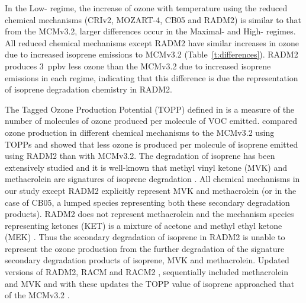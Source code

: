 In the Low- regime, the increase of ozone with temperature using the reduced chemical mechanisms (CRIv2, MOZART-4, CB05 and RADM2) is similar to that from the MCMv3.2, larger differences occur in the Maximal- and High- regimes.
All reduced chemical mechanisms except RADM2 have similar increases in ozone due to increased isoprene emissions to MCMv3.2 (Table~\ref{t:differences}).
RADM2 produces $3$~ppbv less ozone than the MCMv3.2 due to increased isoprene emissions in each  regime, indicating that this difference is due the representation of isoprene degradation chemistry in RADM2.

The Tagged Ozone Production Potential (TOPP) defined in \citet{Butler:2011} is a measure of the number of molecules of ozone produced per molecule of VOC emitted.
\citet{Coates:2015} compared ozone production in different chemical mechanisms to the MCMv3.2 using TOPPs and showed that less ozone is produced per molecule of isoprene emitted using RADM2 than with MCMv3.2.
The degradation of isoprene has been extensively studied and it is well-known that methyl vinyl ketone (MVK) and methacrolein are signatures of isoprene degradation \citep{Atkinson:2000}.
All chemical mechanisms in our study except RADM2 explicitly represent MVK and methacrolein (or in the case of CB05, a lumped species representing both these secondary degradation products).
RADM2 does not represent methacrolein and the mechanism species representing ketones (KET) is a mixture of acetone and methyl ethyl ketone (MEK) \citep{Stockwell:1990}. 
Thus the secondary degradation of isoprene in RADM2 is unable to represent the ozone production from the further degradation of the signature secondary degradation products of isoprene, MVK and methacrolein.
Updated versions of RADM2, RACM \citep{Stockwell:1997} and RACM2 \citep{Goliff:2013}, sequentially included methacrolein and MVK and with these updates the TOPP value of isoprene approached that of the MCMv3.2 \citep{Coates:2015}.

